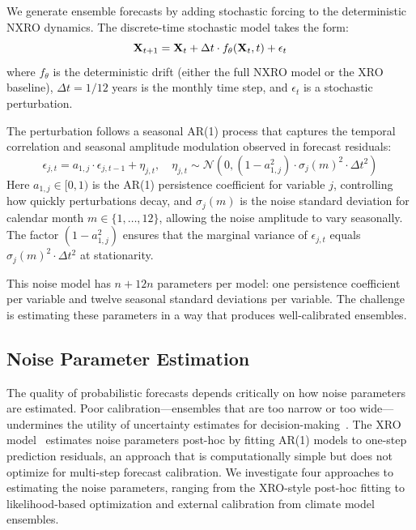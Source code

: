 We generate ensemble forecasts by adding stochastic forcing to the deterministic NXRO dynamics. The discrete-time stochastic model takes the form:
\begin{equation}
    \mathbf{X}_{t+1} = \mathbf{X}_t + \Delta t \cdot f_\theta(\mathbf{X}_t, t) + \epsilon_t
    \label{eq:stochastic_model}
\end{equation}
where $f_\theta$ is the deterministic drift (either the full NXRO model or the XRO baseline), $\Delta t = 1/12$ years is the monthly time step, and $\epsilon_t$ is a stochastic perturbation.

The perturbation follows a seasonal AR(1) process that captures the temporal correlation and seasonal amplitude modulation observed in forecast residuals:
\begin{equation}
    \epsilon_{j,t} = a_{1,j} \cdot \epsilon_{j,t-1} + \eta_{j,t}, \quad \eta_{j,t} \sim \mathcal{N}(0, (1 - a_{1,j}^2) \cdot \sigma_j(m)^2 \cdot \Delta t^2)
    \label{eq:ar1_noise}
\end{equation}
Here $a_{1,j} \in [0, 1)$ is the AR(1) persistence coefficient for variable $j$, controlling how quickly perturbations decay, and $\sigma_j(m)$ is the noise standard deviation for calendar month $m \in \{1, \ldots, 12\}$, allowing the noise amplitude to vary seasonally. The factor $(1 - a_{1,j}^2)$ ensures that the marginal variance of $\epsilon_{j,t}$ equals $\sigma_j(m)^2 \cdot \Delta t^2$ at stationarity.

This noise model has $n + 12n$ parameters per model: one persistence coefficient per variable and twelve seasonal standard deviations per variable. The challenge is estimating these parameters in a way that produces well-calibrated ensembles.

\subsection{Noise Parameter Estimation}

The quality of probabilistic forecasts depends critically on how noise parameters are estimated. Poor calibration---ensembles that are too narrow or too wide---undermines the utility of uncertainty estimates for decision-making~\cite{vannitsem2021statistical}. The XRO model~\cite{zhao2024xro} estimates noise parameters post-hoc by fitting AR(1) models to one-step prediction residuals, an approach that is computationally simple but does not optimize for multi-step forecast calibration. We investigate four approaches to estimating the noise parameters, ranging from the XRO-style post-hoc fitting to likelihood-based optimization and external calibration from climate model ensembles.

